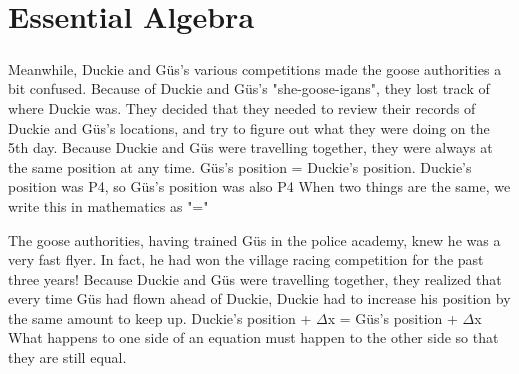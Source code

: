 \chapter{Essential Algebra}
\paragraph{} Meanwhile, Duckie and Güs's various competitions made the goose authorities a bit confused. Because of Duckie and Güs's "she-goose-igans", they lost track of where Duckie was. They decided that they needed to review their records of Duckie and Güs's locations, and try to figure out what they were doing on the 5th day. 
\vfill
\pagebreak
{Because Duckie and Güs were travelling together, they were always at the same position at any time.}
{Güs's position = Duckie's position. Duckie's position was P4, so Güs's position was also P4}
{When two things are the same, we write this in mathematics as "="}
{}
{The goose authorities, having trained Güs in the police academy, knew he was a very fast flyer. In fact, he had won the village racing competition for the past three years! Because Duckie and Güs were travelling together, they realized that every time Güs had flown ahead of Duckie, Duckie had to increase his position by the same amount to keep up.}
{Duckie's position + $\Delta$x = Güs's position + $\Delta$x}
{What happens to one side of an equation must happen to the other side so that they are still equal.}
